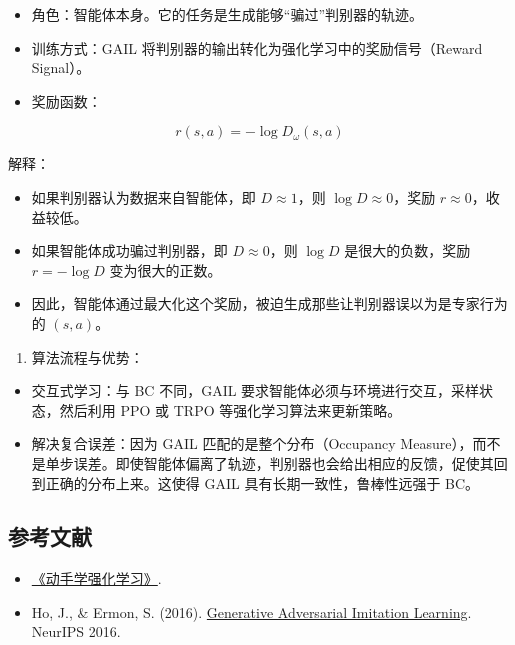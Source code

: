 \begin{itemize}
\tightlist
\item
  角色：智能体本身。它的任务是生成能够``骗过''判别器的轨迹。
\item
  训练方式：GAIL 将判别器的输出转化为强化学习中的奖励信号（Reward Signal）。
\item
  奖励函数：
\end{itemize}

\[
r(s,a)
=
-
\log D_\omega(s,a)
\]

解释：

\begin{itemize}
\tightlist
\item
  如果判别器认为数据来自智能体，即 \(D\approx 1\)，则 \(\log D\approx 0\)，奖励 \(r\approx 0\)，收益较低。
\item
  如果智能体成功骗过判别器，即 \(D\approx 0\)，则 \(\log D\) 是很大的负数，奖励 \(r=-\log D\) 变为很大的正数。
\item
  因此，智能体通过最大化这个奖励，被迫生成那些让判别器误以为是专家行为的 \((s,a)\)。
\end{itemize}

\begin{enumerate}
\def\labelenumi{\arabic{enumi}.}
\setcounter{enumi}{2}
\tightlist
\item
  算法流程与优势：
\end{enumerate}

\begin{itemize}
\tightlist
\item
  交互式学习：与 BC 不同，GAIL 要求智能体必须与环境进行交互，采样状态，然后利用 PPO 或 TRPO 等强化学习算法来更新策略。
\item
  解决复合误差：因为 GAIL 匹配的是整个分布（Occupancy Measure），而不是单步误差。即使智能体偏离了轨迹，判别器也会给出相应的反馈，促使其回到正确的分布上来。这使得 GAIL 具有长期一致性，鲁棒性远强于 BC。
\end{itemize}

\hypertarget{ux53c2ux8003ux6587ux732e-60}{%
\subsection{参考文献}\label{ux53c2ux8003ux6587ux732e-60}}

\begin{itemize}
\tightlist
\item
  \href{https://hrl.boyuai.com/}{《动手学强化学习》}.
\item
  Ho, J., \& Ermon, S. (2016). \href{https://arxiv.org/abs/1606.03476}{Generative Adversarial Imitation Learning}. NeurIPS 2016.
\end{itemize}


